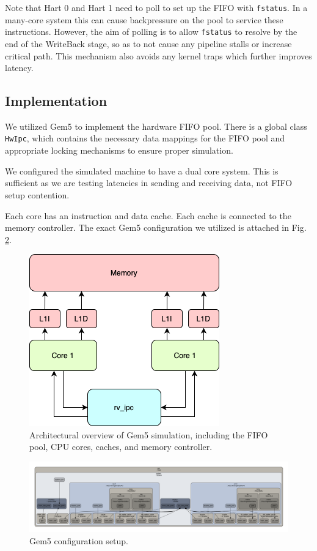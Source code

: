 Note that Hart 0 and Hart 1 need to poll to set up the FIFO with \texttt{fstatus}. In a many-core system this can cause backpressure on the pool to service these instructions. However, the aim of polling is to allow \texttt{fstatus} to resolve by the end of the WriteBack stage, so as to not cause any pipeline stalls or increase critical path. This mechanism also avoids any kernel traps which further improves latency.


\subsection{Implementation}
We utilized Gem5 to implement the hardware FIFO pool. There is a global class \texttt{HwIpc}, which contains the necessary data mappings for the FIFO pool and appropriate locking mechanisms to ensure proper simulation. 

We configured the simulated machine to have a dual core system. This is sufficient as we are testing latencies in sending and receiving data, not FIFO setup contention. 

Each core has an instruction and data cache. Each cache is connected to the memory controller. The exact Gem5 configuration we utilized is attached in Fig. \ref{fig:gem5}.

\begin{figure}[h]
  \centering
  \includegraphics[width=0.6\linewidth]{figures/hardware.png}
  \caption{Architectural overview of Gem5 simulation, including the FIFO pool, CPU cores, caches, and memory controller.}
  \label{fig:hw_ipc}
\end{figure}

\begin{figure}[h]
  \centering
  \includegraphics[width=1.0\linewidth]{figures/gem5.pdf}
  \caption{Gem5 configuration setup.}
  \label{fig:gem5}
\end{figure}

